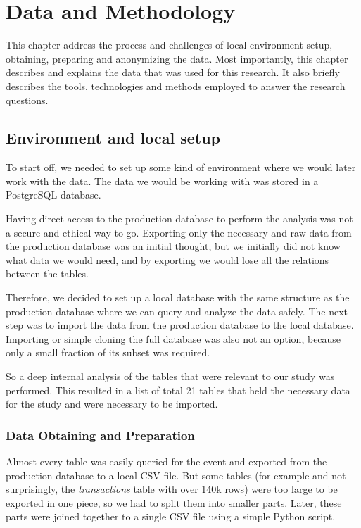 \chapter{Data and Methodology}
\label{ch:data-methodology}
This chapter address the process and challenges of local environment setup, obtaining, preparing and anonymizing the data.
Most importantly, this chapter describes and explains the data that was used for this research.
It also briefly describes the tools, technologies and methods employed to answer the research questions.


\section{Environment and local setup}
\label{sec:data-methodology-environment}

To start off, we needed to set up some kind of environment where we would later work with the data.
The data we would be working with was stored in a PostgreSQL database.

Having direct access to the production database to perform the analysis was not a secure and ethical way to go.
Exporting only the necessary and raw data from the production database was an initial thought, but we initially did not know what data we would need, and by exporting we would lose all the relations between the tables.

Therefore, we decided to set up a local database with the same structure as the production database where we can query and analyze the data safely.
The next step was to import the data from the production database to the local database.
Importing or simple cloning the full database was also not an option, because only a small fraction of its subset was required.

So a deep internal analysis of the tables that were relevant to our study was performed.
This resulted in a list of total 21 tables that held the necessary data for the study and were necessary to be imported.

\subsection{Data Obtaining and Preparation}
\label{subsec:data-methodology-obtaining-preparation}

Almost every table was easily queried for the event and exported from the production database to a local CSV file.
But some tables (for example and not surprisingly, the \textit{transactions} table with over 140k rows) were too large to be exported in one piece, so we had to split them into smaller parts.
Later, these parts were joined together to a single CSV file using a simple Python script.


